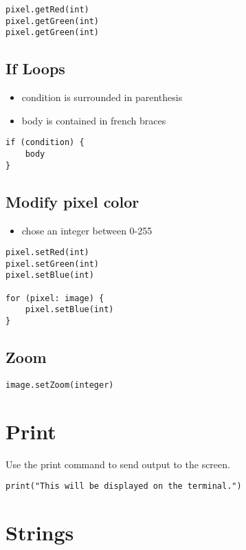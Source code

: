 \documentclass{article}
\begin{document}
\begin{lstlisting}
pixel.getRed(int)
pixel.getGreen(int)
pixel.getGreen(int)
\end{lstlisting}

\subsection{If Loops}
\begin{itemize}
  \item condition is surrounded in parenthesis
  \item body is contained in french braces
\end{itemize}
\begin{lstlisting}
if (condition) {
    body
}
\end{lstlisting}
\subsection{Modify pixel color}
\begin{itemize}
  \item chose an integer between 0-255
\end{itemize}
\begin{lstlisting}
pixel.setRed(int)
pixel.setGreen(int)
pixel.setBlue(int)

for (pixel: image) {
    pixel.setBlue(int)
}
\end{lstlisting}

\subsection{Zoom}
\begin{lstlisting}
image.setZoom(integer)
\end{lstlisting}

\section{Print}
Use the print command to send output to the screen.

\begin{lstlisting}
print("This will be displayed on the terminal.")
\end{lstlisting}

\section{Strings}
\end{document}
